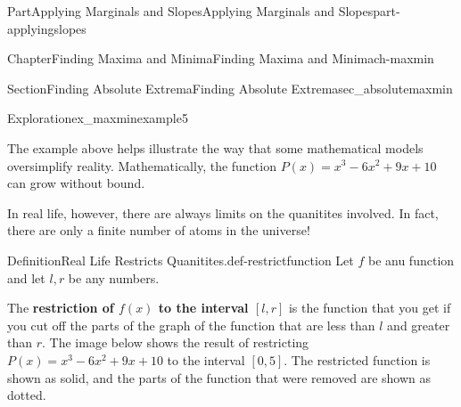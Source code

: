 \documentclass[oneside,10pt,]{tufte-book}
\newcommand{\terminology}[1]{\textbf{#1}}
\numberwithin{equation}{chapter}
\begin{document}
\begin{partptx}{Part}{Applying Marginals and Slopes}{}{Applying Marginals and Slopes}{}{}{part-applyingslopes}
\begin{chapterptx}{Chapter}{Finding Maxima and Minima}{}{Finding Maxima and Minima}{}{}{ch-maxmin}
\begin{sectionptx}{Section}{Finding Absolute Extrema}{}{Finding Absolute Extrema}{}{}{sec_absolutemaxmin}
\begin{exploration}{Exploration}{}{ex_maxminexample5}
\begin{enumerate}[font=\bfseries,label=(\alph*),ref=\alph*]
\begin{image}{0.25}{0.5}{0.25}{}
{
}%
\end{image}%
%
\end{enumerate}%
\end{exploration}%
The example above helps illustrate the way that some mathematical models oversimplify reality. Mathematically, the function \(P(x) = x^3 - 6x^2 + 9x + 10\) can grow without bound.%
\par
In real life, however, there are always limits on the quanitites involved. In fact, there are only a finite number of atoms in the universe!%
\begin{definition}{Definition}{Real Life Restricts Quanitites.}{def-restrictfunction}%
Let \(f\) be anu function and let \(l,r\) be any numbers.%
\par
The \terminology{restriction of \(f(x)\) to the interval \([l,r]\)} is the function that you get if you cut off the parts of the graph of the function that are less than \(l\) and greater than \(r\).%
The image below shows the result of restricting \(P(x) = x^3 - 6x^2 + 9x + 10\) to the interval \([0,5]\).  The restricted function is shown as solid, and the parts of the function that were removed are shown as dotted.%
\begin{image}{0.25}{0.5}{0.25}{}%
\end{image}
\end{definition}
\end{sectionptx}
\end{chapterptx}
\end{partptx}
\end{document}
